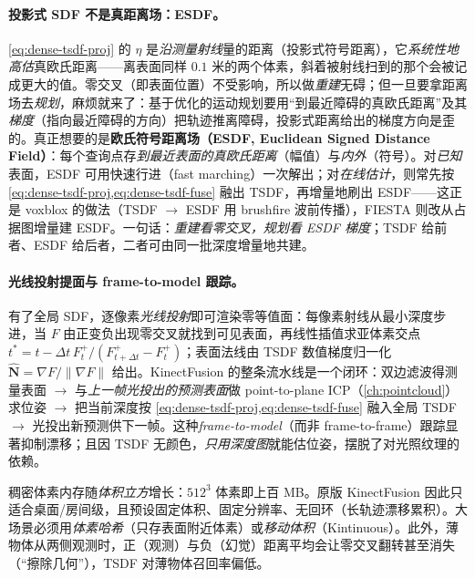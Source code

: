 \paragraph{投影式 SDF 不是真距离场：ESDF。}
\cref{eq:dense-tsdf-proj} 的 $\eta$ 是\emph{沿测量射线}量的距离（投影式符号距离），它\emph{系统性地高估}真欧氏距离——离表面同样 $0.1$ 米的两个体素，斜着被射线扫到的那个会被记成更大的值。零交叉（即表面位置）不受影响，所以做\emph{重建}无碍；但一旦要拿距离场去\emph{规划}，麻烦就来了：基于优化的运动规划要用“到最近障碍的真欧氏距离”及其\emph{梯度}（指向最近障碍的方向）把轨迹推离障碍，投影式距离给出的梯度方向是歪的。真正想要的是\textbf{欧氏符号距离场（ESDF, Euclidean Signed Distance Field）}：每个查询点存\emph{到最近表面的真欧氏距离}（幅值）与\emph{内外}（符号）。对\emph{已知}表面，ESDF 可用快速行进（fast marching）一次解出；对\emph{在线估计}，则常先按 \cref{eq:dense-tsdf-proj,eq:dense-tsdf-fuse} 融出 TSDF，再增量地刷出 ESDF——这正是 voxblox\cite{oleynikova2017voxblox} 的做法（TSDF $\to$ ESDF 用 brushfire 波前传播），FIESTA\cite{han2019fiesta} 则改从占据图增量建 ESDF。一句话：\emph{重建看零交叉，规划看 ESDF 梯度}；TSDF 给前者、ESDF 给后者，二者可由同一批深度增量地共建。

\paragraph{光线投射提面与 frame-to-model 跟踪。}
有了全局 SDF，逐像素\emph{光线投射}即可渲染零等值面：每像素射线从最小深度步进，当 $F$ 由正变负出现零交叉就找到可见表面，再线性插值求亚体素交点 $t^*=t-\Delta t\,F_t^+/(F_{t+\Delta t}^+-F_t^+)$；表面法线由 TSDF 数值梯度归一化 $\hat{\mathbf{N}}=\nabla F/\|\nabla F\|$ 给出。KinectFusion 的整条流水线是一个闭环：双边滤波得测量表面 $\to$ 与\emph{上一帧光投出的预测表面}做 point-to-plane ICP（\cref{ch:pointcloud}）求位姿 $\to$ 把当前深度按 \cref{eq:dense-tsdf-proj,eq:dense-tsdf-fuse} 融入全局 TSDF $\to$ 光投出新预测供下一帧。这种\emph{frame-to-model}（而非 frame-to-frame）跟踪显著抑制漂移；且因 TSDF 无颜色，\emph{只用深度图}就能估位姿，摆脱了对光照纹理的依赖。

\begin{pitfall}
稠密体素内存随\emph{体积立方}增长：$512^3$ 体素即上百 MB。原版 KinectFusion 因此只适合桌面/房间级，且预设固定体积、固定分辨率、无回环（长轨迹漂移累积）。大场景必须用\emph{体素哈希}（只存表面附近体素）或\emph{移动体积}（Kintinuous）。此外，薄物体从两侧观测时，正（观测）与负（幻觉）距离平均会让零交叉翻转甚至消失（“擦除几何”），TSDF 对薄物体召回率偏低。
\end{pitfall}

